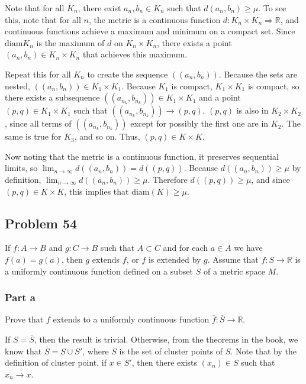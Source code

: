 \documentclass{article}
\newcommand{\diam}{\text{diam}}
\newcommand{\R}{\mathbb{R}}
\begin{document}
Note that for all $K_n$, there exist $a_n, b_n \in K_n$ such that $d(a_n, b_n) \geq \mu$. To see this, note that for all $n$, the metric is a continuous function $d: K_n \times K_n \Rightarrow \R$, and continuous functions achieve a maximum and minimum on a compact set. Since $\diam K_n$ is the maximum of $d$ on $K_n \times K_n$, there exists a point $(a_n, b_n) \in K_n \times K_n$ that achieves this maximum.

Repeat this for all $K_n$ to create the sequence $((a_n, b_n))$. Because the sets are nested, $((a_n, b_n)) \in K_1 \times K_1$. Because $K_1$ is compact, $K_1 \times K_1$ is compact, so there exists a subsequence $((a_{n_k}, b_{n_k})) \in K_1 \times K_1$ and a point $(p, q) \in K_1 \times K_1$ such that $((a_{n_k}, b_{n_k})) \rightarrow (p, q)$. $(p, q)$ is also in $K_2 \times K_2$, since all terms of $((a_{n_k}, b_{n_k}))$ except for possibly the first one are in $K_2$. The same is true for $K_3$, and so on. Thus, $(p, q) \in K \times K$.

Now noting that the metric is a continuous function, it preserves sequential limits, so $\lim_{n \rightarrow \infty} d((a_n, b_n)) = d((p, q))$. Because $d((a_n, b_n)) \geq \mu$ by definition, $\lim_{n \rightarrow \infty} d((a_n, b_n)) \geq \mu$. Therefore $d((p, q)) \geq \mu$, and since $(p, q) \in K \times K$, this implies that $\diam(K) \geq \mu$.

\subsection*{Problem 54}

If $f: A \rightarrow B$ and $g: C \rightarrow B$ such that $A \subset C$ and for each $a \in A$ we have $f(a) = g(a)$, then $g$ extends $f$, or $f$ is extended by $g$. Assume that $f : S \rightarrow \R$ is a uniformly continuous function defined on a subset $S$ of a metric space $M$.

\subsubsection*{Part a}

Prove that $f$ extends to a uniformly continuous function $\bar{f}: \bar{S} \rightarrow \R$.

If $S = \bar{S}$, then the result is trivial. Otherwise, from the theorems in the book, we know that $\bar{S} = S \cup S'$, where $S$ is the set of cluster points of $S$. Note that by the definition of cluster point, if $x \in S'$, then there exists $(x_n) \in S$ such that $x_n \rightarrow x$.
\end{document}
